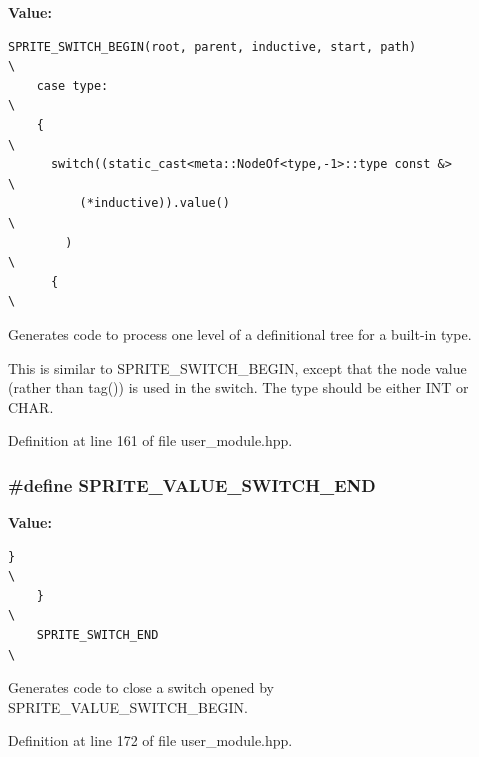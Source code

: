 {\bf Value:}

\footnotesize\begin{verbatim}SPRITE_SWITCH_BEGIN(root, parent, inductive, start, path)                 \
    case type:                                                                \
    {                                                                         \
      switch((static_cast<meta::NodeOf<type,-1>::type const &>                \
          (*inductive)).value()                                               \
        )                                                                     \
      {                                                                       \
\end{verbatim}\normalsize 
Generates code to process one level of a definitional tree for a built-in type. 

This is similar to SPRITE\_\-SWITCH\_\-BEGIN, except that the node value (rather than tag()) is used in the switch. The type should be either INT or CHAR. 

Definition at line 161 of file user\_\-module.hpp.
\subsubsection{\setlength{\rightskip}{0pt plus 5cm}\#define SPRITE\_\-VALUE\_\-SWITCH\_\-END}\label{user__module_8hpp_a4}


{\bf Value:}

\footnotesize\begin{verbatim}}                                                                      \
    }                                                                        \
    SPRITE_SWITCH_END                                                        \
\end{verbatim}\normalsize 
Generates code to close a switch opened by SPRITE\_\-VALUE\_\-SWITCH\_\-BEGIN. 



Definition at line 172 of file user\_\-module.hpp.